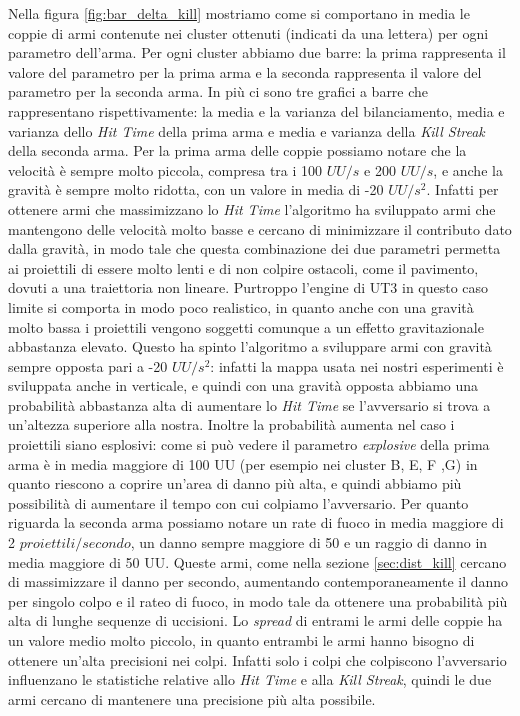 \documentclass[12pt, italian]{toptesi}
\begin{document}
Nella figura \ref{fig:bar_delta_kill} mostriamo come si comportano in media le coppie di armi contenute nei cluster ottenuti (indicati da una lettera) per ogni parametro dell'arma. Per ogni cluster abbiamo due barre: la prima rappresenta il valore del parametro per la prima arma e la seconda rappresenta il valore del parametro per la seconda arma. In più ci sono tre grafici a barre che rappresentano rispettivamente: la media e la varianza del bilanciamento, media e varianza dello \emph{Hit Time} della prima arma e media e varianza della \emph{Kill Streak} della seconda arma.
Per la prima arma delle coppie possiamo notare che la velocità è sempre molto piccola, compresa tra i 100 $UU/s$ e 200 $UU/s$, e anche la gravità è sempre molto ridotta, con un valore in media di -20 $UU/s^2$. Infatti per ottenere armi che massimizzano lo \emph{Hit Time} l'algoritmo ha sviluppato armi che mantengono delle velocità molto basse e cercano di minimizzare il contributo dato dalla gravità, in modo tale che questa combinazione dei due parametri permetta ai proiettili di essere molto lenti e di non colpire ostacoli, come il pavimento, dovuti a una traiettoria non lineare. Purtroppo l'engine di UT3 in questo caso limite si comporta in modo poco realistico, in quanto anche con una gravità molto bassa i proiettili vengono soggetti comunque a un effetto gravitazionale abbastanza elevato. Questo ha spinto l'algoritmo a sviluppare armi con gravità sempre opposta pari a -20 $UU/{s^{2}}$: infatti la mappa usata nei nostri esperimenti è sviluppata anche in verticale, e quindi con una gravità opposta abbiamo una probabilità abbastanza alta di aumentare lo \emph{Hit Time} se l'avversario si trova a un'altezza superiore alla nostra. Inoltre la probabilità aumenta nel caso i proiettili siano esplosivi: come si può vedere il parametro \emph{explosive} della prima arma è in media maggiore di 100 UU (per esempio nei cluster B, E, F ,G) in quanto riescono a coprire un'area di danno più alta, e quindi abbiamo più possibilità di aumentare il tempo con cui colpiamo l'avversario.
Per quanto riguarda la seconda arma possiamo notare un rate di fuoco in media maggiore di 2 $proiettili/secondo$, un danno sempre maggiore di 50 e un raggio di danno in media maggiore di 50 UU. Queste armi, come nella sezione \ref{sec:dist_kill} cercano di massimizzare il danno per secondo, aumentando contemporaneamente il danno per singolo colpo e il rateo di fuoco, in modo tale da ottenere una probabilità più alta di lunghe sequenze di uccisioni.
Lo \emph{spread} di entrami le armi delle coppie ha un valore medio molto piccolo, in quanto entrambi le armi hanno bisogno di ottenere un'alta precisioni nei colpi. Infatti solo i colpi che colpiscono l'avversario influenzano le statistiche relative allo \emph{Hit Time} e alla \emph{Kill Streak}, quindi le due armi cercano di mantenere una precisione più alta possibile.
\end{document}
